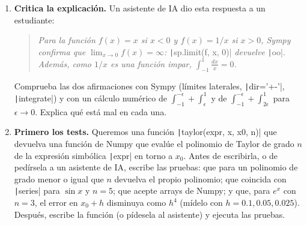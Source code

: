 \begin{enumerate}
\item \label{ej:sim_ia} \textbf{Critica la explicación.} Un asistente de IA dio esta respuesta a un estudiante:
\begin{quote}
\emph{Para la función $f(x)=x$ si $x<0$ y $f(x)=1/x$ si $x>0$, Sympy confirma que $\lim_{x\to0}f(x)=\infty$:} \texttt|sp.limit(f, x, 0)| \emph{devuelve} \texttt|oo|. \emph{Además, como $1/x$ es una función impar, $\int_{-1}^{1}\frac{dx}{x}=0$.}
\end{quote}
Comprueba las dos afirmaciones con Sympy (límites laterales, \texttt|dir='+-'|, \texttt|integrate|) y con un cálculo numérico de $\int_{-1}^{-\epsilon}+\int_{\epsilon}^{1}$ y de $\int_{-1}^{-\epsilon}+\int_{2\epsilon}^{1}$ para $\epsilon\to0$. Explica qué está mal en cada una.

\item \label{ej:sim_tests} \textbf{Primero los tests.} Queremos una función \texttt|taylor(expr, x, x0, n)| que devuelva una función de Numpy que evalúe el polinomio de Taylor de grado $n$ de la expresión simbólica \texttt|expr| en torno a $x_0$. Antes de escribirla, o de pedírsela a un asistente de IA, escribe las pruebas: que para un polinomio de grado menor o igual que $n$ devuelva el propio polinomio; que coincida con \texttt|series| para $\sin x$ y $n=5$; que acepte arrays de Numpy; y que, para $e^x$ con $n=3$, el error en $x_0+h$ disminuya como $h^4$ (mídelo con $h=0.1, 0.05, 0.025$). Después, escribe la función (o pídesela al asistente) y ejecuta las pruebas.
\end{enumerate}

